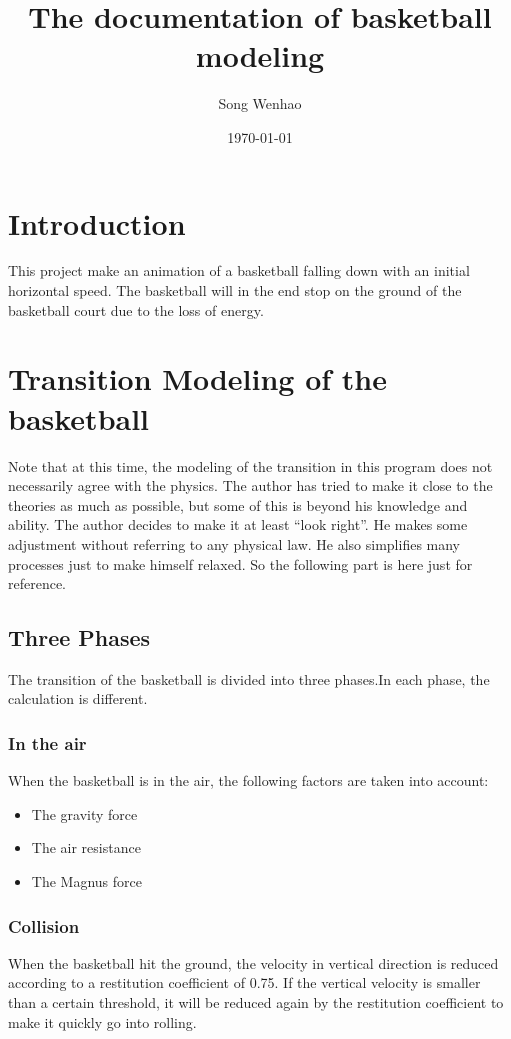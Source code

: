 \documentclass[10pt,a4paper]{article}
\begin{document}
\title{The documentation of basketball modeling}
\author{Song Wenhao}
\date{\today}
\maketitle
\section{Introduction}
This project make an animation of a basketball falling down with an initial horizontal speed. The basketball will in the end stop on the ground of the basketball court due to the loss of energy.

\section{Transition Modeling of the basketball}
Note that at this time, the modeling of the transition in this program does not necessarily agree with the physics. The author has tried to make it close to the theories as much as possible, but some of this is beyond his knowledge and ability. The author decides to make it at least ``look right''. He makes some adjustment without referring to any physical law. He also simplifies many processes just to make himself relaxed. So the following part is here just for reference.

\subsection{Three Phases}
The transition of the basketball is divided into three phases.In each phase, the calculation is different.
\subsubsection{In the air}
When the basketball is in the air, the following factors are taken into account:
\begin{itemize}
\item The gravity force
\item The air resistance
\item The Magnus force
\end{itemize}

\subsubsection{Collision}
When the basketball hit the ground, the velocity in vertical direction is reduced according to a restitution coefficient of 0.75. If the vertical velocity is smaller than a certain threshold, it will be reduced again by the restitution coefficient to make it quickly go into rolling.
\end{document}
